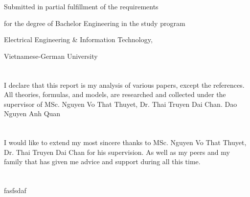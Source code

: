 \documentclass[main.tex]{subfiles}
\begin{document}
    \vspace{2cm}
    \centerline{Submitted in partial fulfillment of the requirements}
    \centerline{for the degree of Bachelor Engineering in the study program}
    \centerline{Electrical Engineering \& Information Technology,}
    \centerline{Vietnamese-German University}

    \pagebreak
    \section*{}
    \justify
    I declare that this report is my analysis of various papers, except the references. All theories, formulas, and models, are researched and collected under the supervisor of MSc. Nguyen Vo That Thuyet, Dr. Thai Truyen Dai Chan.
    \justify
    \hspace{10cm}Dao Nguyen Anh Quan

    \pagebreak
    \section*{}
    \justify
    I would like to extend my most sincere thanks to MSc. Nguyen Vo That Thuyet, Dr. Thai Truyen Dai Chan for his supervision. As well as my peers and my family that has given me advice and support during all this time.

    \pagebreak
    \section*{}
    \justify
    fasfsdaf
\end{document}
